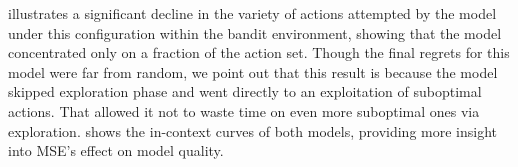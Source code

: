 
 illustrates a significant decline in the variety of actions attempted by the model under this configuration within the bandit environment, showing that the model concentrated only on a fraction of the action set. Though the final regrets for this model were far from random, we point out that this result is because the model skipped exploration phase and went directly to an exploitation of suboptimal actions. That allowed it not to waste time on even more suboptimal ones via exploration.  shows the in-context curves of both models, providing more insight into MSE's effect on model quality.

